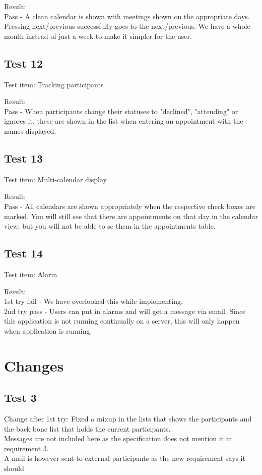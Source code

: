 Result: \\Pass - A clean calendar is shown with meetings shown on the appropriate days. Pressing next/previous successfully goes to the next/previous. We have a whole month instead of just a week to make it simpler for the user.

\subsection{Test 12}
Test item: Tracking participants

Result: \\Pass - When participants change their statuses to "declined", "attending" or ignores it, these are shown in the list when entering an appointment with the names displayed.

\subsection{Test 13}
Test item: Multi-calendar display

Result: \\Pass - All calendars are shown appropriately when the respective check boxes are marked. You will still see that there are appointments on that day in the calendar view, but you will not be able to se them in the appointments table.

\subsection{Test 14}
Test item: Alarm

Result: \\1st try fail - We have overlooked this while implementing.\\
2nd try pass - Users can put in alarms and will get a message via email. Since this application is not running continually on a server, this will only happen when application is running.

\section{Changes}
\subsection{Test 3}
Change after 1st try: Fixed a mixup in the lists that shows the participants and the back bone list that holds the current participants.\\
Messages are not included here as the specification does not mention it in requirement 3.\\
A mail is however sent to external participants as the new requirement says it should

